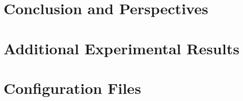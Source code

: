 \documentclass[12pt,a4paper,oneside]{book}
\theoremstyle{plain}
\begin{document}
\chapter*{Conclusion and Perspectives}
\label{ch:conclusion}

\clearpage

\backmatter


\clearpage

\begin{appendices}
\chapter{Additional Experimental Results}
\label{app:results}


\chapter{Configuration Files}
\label{app:config}

\end{appendices}
\end{document}
